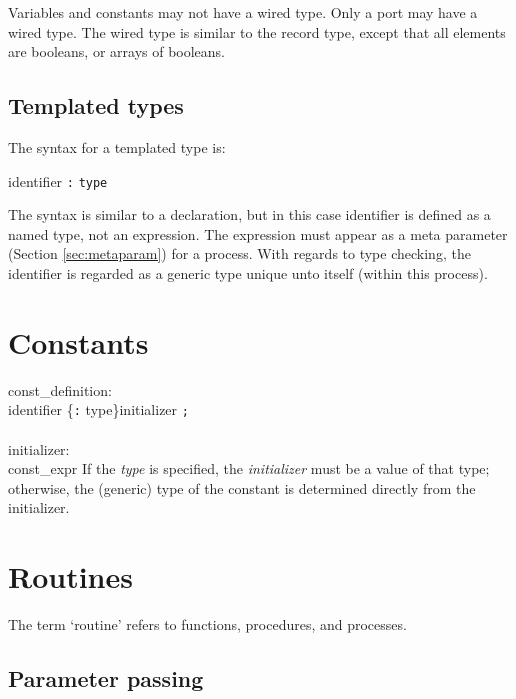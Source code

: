 Variables and constants may not have a wired type.  Only a port may have a
wired type.  The wired type is similar to the record type, except that all
elements are booleans, or arrays of booleans.

\subsection{Templated types}\label{sec:template}

The syntax for a templated type is:

\grammarstart
      \>identifier {\tt{}:} {\tt{}type}
\grammarend

The syntax is similar to a declaration, but in this case identifier is defined as a
named type, not an expression.  The expression must appear as a meta parameter
(Section \ref{sec:metaparam}) for a process.  With regards to type checking, the
identifier is regarded as a generic type unique unto itself (within this process).


\section{Constants}\label{sec:const}

\grammarstart
const\_definition: \\
       identifier \{{\tt{}:} type\}\OPT initializer {\tt{};} \\
 \\
initializer: \\
      \>{\tt{}=} const\_expr
\grammarend
If the {\it{}type} is specified, the {\it{}initializer} must be a value of that type;
otherwise, the (generic) type of the constant is determined directly
from the initializer.



\section{Routines}\label{sec:routines}

The term `routine' refers to functions, procedures, and processes.

\subsection{Parameter passing}\label{sec:parameters}


